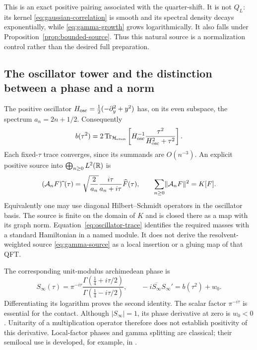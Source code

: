 This is an exact positive pairing associated with the quarter-shift.
It is not $Q_L$: its kernel \eqref{eq:gaussian-correlation} is smooth
and its spectral density decays exponentially, while
\eqref{eq:gamma-growth} grows logarithmically. It also falls under
Proposition~\ref{prop:bounded-source}. Thus this natural source is a
normalization control rather than the desired full preparation.

\subsection{The oscillator tower and the distinction between a phase and a norm}
The positive oscillator
$H_{\rm osc}=\tfrac12(-\partial_y^2+y^2)$ has, on its even subspace,
the spectrum $a_n=2n+1/2$. Consequently
\begin{equation}\label{eq:oscillator-trace}
 b(\tau^2)=2\operatorname{Tr}_{\mathcal H_{\rm even}}
 \left[H_{\rm osc}^{-1}\frac{\tau^2}{H_{\rm osc}^2+\tau^2}\right].
\end{equation}
Each fixed-$\tau$ trace converges, since its summands are $O(n^{-3})$.
An explicit positive source into
$\bigoplus_{n\geq0}L^2(\mathbb R)$ is
\begin{equation}\label{eq:gamma-source}
 (\mathcal A_nF)\widehat{\ }(\tau)
 =\sqrt{\frac2{a_n}}\frac{i\tau}{a_n+i\tau}\widehat F(\tau),
 \qquad \sum_{n\geq0}\lVert \mathcal A_nF\rVert^2=K[F].
\end{equation}
Equivalently one may use diagonal Hilbert--Schmidt operators in the
oscillator basis. The source is finite on the domain of $K$ and is
closed there as a map with its graph norm. Equation~\eqref{eq:oscillator-trace}
identifies the required masses with a standard Hamiltonian in a named
module. It does not derive the resolvent-weighted source
\eqref{eq:gamma-source} as a local insertion or a gluing map of that QFT.

The corresponding unit-modulus archimedean phase is
\begin{equation}\label{eq:arch-phase}
 S_\infty(\tau)=\pi^{-i\tau}
 \frac{\Gamma(\tfrac14+i\tau/2)}{\Gamma(\tfrac14-i\tau/2)},
 \qquad
 -i\overline{S_\infty}S_\infty'
 =b(\tau^2)+w_0.
\end{equation}
Differentiating its logarithm proves the second identity. The scalar
factor $\pi^{-i\tau}$ is essential for the contact. Although
$|S_\infty|=1$, its phase derivative at zero is $w_0<0$. Unitarity of
a multiplication operator therefore does not establish positivity of
this derivative. Local-factor phases and gamma splitting are classical;
their semilocal use is developed, for example, in \cite{QuasiInner}.

